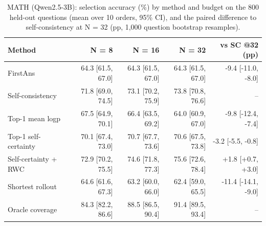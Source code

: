 \begin{table}[t]
\centering
\small
\caption{MATH (Qwen2.5-3B): selection accuracy (\%) by method and budget on the 800 held-out questions (mean over 10 orders, 95\% CI), and the paired difference to self-consistency at N = 32 (pp, 1,000 question bootstrap resamples).}
\label{tab:T3_methods_math}
\begin{tabular}{lrrrr}
\toprule
Method & N = 8 & N = 16 & N = 32 & vs SC @32 (pp) \\
\midrule
FirstAns & 64.3 [61.5, 67.0] & 64.3 [61.5, 67.0] & 64.3 [61.5, 67.0] & -9.4 [-11.0, -8.0] \\
Self-consistency & 71.8 [69.0, 74.5] & 73.1 [70.2, 75.9] & 73.8 [70.8, 76.6] & -- \\
Top-1 mean logp & 67.5 [64.9, 70.1] & 66.4 [63.5, 69.2] & 64.0 [60.9, 67.0] & -9.8 [-12.4, -7.4] \\
Top-1 self-certainty & 70.1 [67.4, 73.0] & 70.7 [67.7, 73.6] & 70.6 [67.5, 73.8] & -3.2 [-5.5, -0.8] \\
Self-certainty + RWC & 72.9 [70.2, 75.5] & 74.6 [71.8, 77.3] & 75.6 [72.6, 78.4] & +1.8 [+0.7, +3.0] \\
Shortest rollout & 64.6 [61.6, 67.3] & 63.2 [60.0, 66.0] & 62.4 [59.0, 65.5] & -11.4 [-14.1, -9.0] \\
Oracle coverage & 84.3 [82.2, 86.6] & 88.5 [86.5, 90.4] & 91.4 [89.5, 93.4] & -- \\
\bottomrule
\end{tabular}
\end{table}
